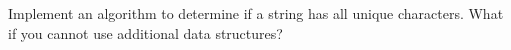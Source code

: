  \label{sssec:ex1_01}

Implement an algorithm to determine if a string has all unique characters. What if you cannot use additional data structures?





